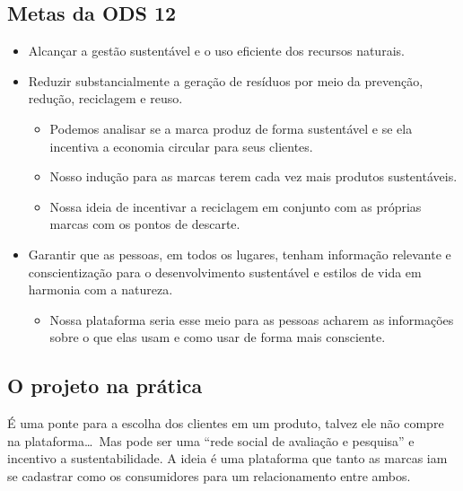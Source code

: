 \documentclass[12pt, a4paper]{article}
\begin{document}
\clearpage
\subsection*{Metas da ODS 12}
\begin{itemize}[leftmargin=1.4cm, itemsep=10pt]
  \item[\textcolor{olive}{\textbf{12.2}}] Alcançar a gestão sustentável e o uso eficiente dos recursos naturais.

  \item[\textcolor{olive}{\textbf{12.5}}] Reduzir substancialmente a geração de resíduos por meio da prevenção, redução, reciclagem e reuso.
  \begin{itemize}[label=\textcolor{oliveSoft}{\textbullet}, leftmargin=1cm, topsep=4pt, itemsep=3pt]
    \item Podemos analisar se a marca produz de forma sustentável e se ela incentiva a economia circular para seus clientes.
    \item Nosso indução para as marcas terem cada vez mais produtos sustentáveis.
    \item Nossa ideia de incentivar a reciclagem em conjunto com as próprias marcas com os pontos de descarte.
  \end{itemize}

  \item[\textcolor{olive}{\textbf{12.8}}] Garantir que as pessoas, em todos os lugares, tenham informação relevante e conscientização para o desenvolvimento sustentável e estilos de vida em harmonia com a natureza.
  \begin{itemize}[label=\textcolor{oliveSoft}{\textbullet}, leftmargin=1cm, topsep=4pt, itemsep=3pt]
    \item Nossa plataforma seria esse meio para as pessoas acharem as informações sobre o que elas usam e como usar de forma mais consciente.
  \end{itemize}
\end{itemize}

\subsection*{O projeto na prática}
É uma ponte para a escolha dos clientes em um produto, talvez ele não compre na plataforma\ldots\ Mas pode ser uma ``rede social de avaliação e pesquisa'' e incentivo a sustentabilidade. A ideia é uma plataforma que tanto as marcas iam se cadastrar como os consumidores para um relacionamento entre ambos.
\end{document}
